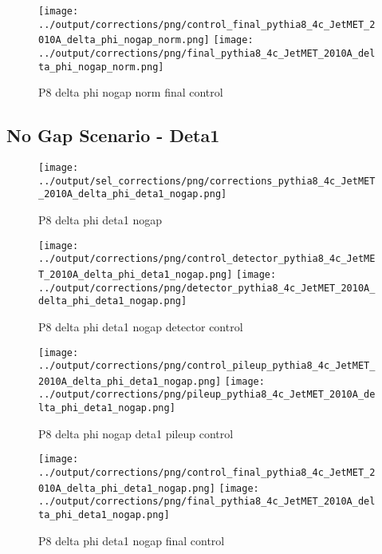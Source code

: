 \documentclass[11pt]{book}
\begin{document}
\begin{figure}[ht]
\centering
\texttt{[image: ../output/corrections/png/control\_final\_pythia8\_4c\_JetMET\_2010A\_delta\_phi\_nogap\_norm.png]}
\texttt{[image: ../output/corrections/png/final\_pythia8\_4c\_JetMET\_2010A\_delta\_phi\_nogap\_norm.png]}
\caption{P8 delta phi nogap norm final control}
\label{fig:p8_JetMET_2010A_delta_phi_nogap_norm_final_control}
\end{figure}




\clearpage
\subsection{No Gap Scenario - Deta1}
\begin{figure}[ht]
\centering
\texttt{[image: ../output/sel\_corrections/png/corrections\_pythia8\_4c\_JetMET\_2010A\_delta\_phi\_deta1\_nogap.png]}
\caption{P8 delta phi deta1 nogap}
\label{fig:p8_JetMET_2010A_delta_phi_deta1_nogap}
\end{figure}

\begin{figure}[ht]
\centering
\texttt{[image: ../output/corrections/png/control\_detector\_pythia8\_4c\_JetMET\_2010A\_delta\_phi\_deta1\_nogap.png]}
\texttt{[image: ../output/corrections/png/detector\_pythia8\_4c\_JetMET\_2010A\_delta\_phi\_deta1\_nogap.png]}
\caption{P8 delta phi deta1 nogap detector control}
\label{fig:p8_JetMET_2010A_delta_phi_deta1_nogap_detector_control}
\end{figure}

\begin{figure}[ht]
\centering
\texttt{[image: ../output/corrections/png/control\_pileup\_pythia8\_4c\_JetMET\_2010A\_delta\_phi\_deta1\_nogap.png]}
\texttt{[image: ../output/corrections/png/pileup\_pythia8\_4c\_JetMET\_2010A\_delta\_phi\_deta1\_nogap.png]}
\caption{P8 delta phi nogap deta1 pileup control}
\label{fig:p8_JetMET_2010A_delta_phi_deta1_nogap_pileup_control}
\end{figure}


\begin{figure}[ht]
\centering
\texttt{[image: ../output/corrections/png/control\_final\_pythia8\_4c\_JetMET\_2010A\_delta\_phi\_deta1\_nogap.png]}
\texttt{[image: ../output/corrections/png/final\_pythia8\_4c\_JetMET\_2010A\_delta\_phi\_deta1\_nogap.png]}
\caption{P8 delta phi deta1 nogap final control}
\label{fig:p8_JetMET_2010A_delta_phi_deta1_nogap_final_control}
\end{figure}
\end{document}
